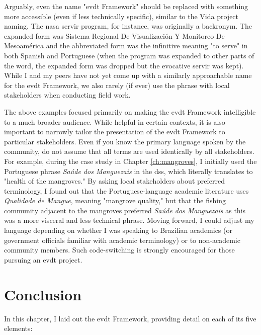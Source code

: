Arguably, even the name "\ac{evdt} Framework" should be replaced with something more accessible (even if less technically specific), similar to the Vida project naming. The \ac{nasa} \ac{servir} program, for instance, was originally a backronym. The expanded form was Sistema Regional De Visualizaci\'{o}n Y Monitoreo De Mesoam\'{e}rica and the abbreviated form was the infinitive meaning "to serve" in both Spanish and Portuguese (when the program was expanded to other parts of the word, the expanded form was dropped but the evocative \ac{servir} was kept). While I and my peers have not yet come up with a similarly approachable name for the \ac{evdt} Framework, we also rarely (if ever) use the phrase with local stakeholders when conducting field work.

The above examples focused primarily on making the \ac{evdt} Framework intelligible to a much broader audience. While helpful in certain contexts, it is also important to narrowly tailor the presentation of the \ac{evdt} Framework to particular stakeholders. Even if you know the primary language spoken by the community, do not assume that all terms are used identically by all stakeholders. For example, during the case study in Chapter \ref{ch:mangroves}, I initially used the Portuguese phrase \textit{Saúde dos Manguezais} in the \ac{dss}, which literally translates to "health of the mangroves." By asking local stakeholders about preferred terminology, I found out that the Portuguese-language academic literature uses \textit{Qualidade de Mangue}, meaning "mangrove quality," but that the fishing community adjacent to the mangroves preferred \textit{Saúde dos Manguezais} as this was a more visceral and less technical phrase. Moving forward, I could adjust my language depending on whether I was speaking to Brazilian academics (or government officials familiar with academic terminology) or to non-academic community members. Such code-switching is strongly encouraged for those pursuing an \ac{evdt} project.

\section{Conclusion} \label{sec:evdt-conclusion}

In this chapter, I laid out the \acf{evdt} Framework, providing detail on each of its five elements:

